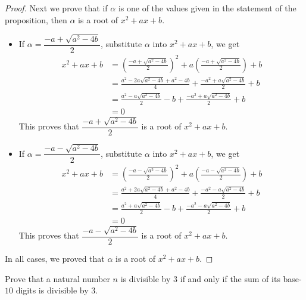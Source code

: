 \begin{solutions*}
    \fixlistskip
    \begin{proof}
    Next we prove that if $\alpha$ is one of the values given in the statement of the proposition, then $\alpha$ is a root of $x^2+ax+b$.
    \begin{itemize}
        \item If $\alpha = \dfrac{-a+\sqrt{a^2-4b}}{2}$, substitute $\alpha$ into $x^2+ax+b$, we get
        \begin{align*}
        x^2+ax+b &= \left(\frac{-a+\sqrt{a^2-4b}}{2}\right)^2 + a\left(\frac{-a+\sqrt{a^2-4b}}{2}\right) + b \\
        &= \frac{a^2-2a\sqrt{a^2-4b}+a^2-4b}{4} + \frac{-a^2+a\sqrt{a^2-4b}}{2} + b \\
        &= \frac{a^2-a\sqrt{a^2-4b}}{2}-b + \frac{-a^2+a\sqrt{a^2-4b}}{2} + b \\
        &= 0
        \end{align*}
        This proves that $\dfrac{-a+\sqrt{a^2-4b}}{2}$ is a root of $x^2+ax+b$.
        \item If $\alpha = \dfrac{-a-\sqrt{a^2-4b}}{2}$, substitute $\alpha$ into $x^2+ax+b$, we get
        \begin{align*}
        x^2+ax+b &= \left(\frac{-a-\sqrt{a^2-4b}}{2}\right)^2 + a\left(\frac{-a-\sqrt{a^2-4b}}{2}\right) + b \\
        &= \frac{a^2+2a\sqrt{a^2-4b}+a^2-4b}{4} + \frac{-a^2-a\sqrt{a^2-4b}}{2} + b \\
        &= \frac{a^2+a\sqrt{a^2-4b}}{2}-b + \frac{-a^2-a\sqrt{a^2-4b}}{2} + b \\
        &= 0
        \end{align*}
        This proves that $\dfrac{-a-\sqrt{a^2-4b}}{2}$ is a root of $x^2+ax+b$.
    \end{itemize}
    In all cases, we proved that $\alpha$ is a root of $x^2+ax+b$.
    \end{proof}
\end{solutions*}

\begin{exercise}
Prove that a natural number $n$ is divisible by $3$ if and only if the sum of its base-$10$ digits is divisible by $3$.
\end{exercise}


